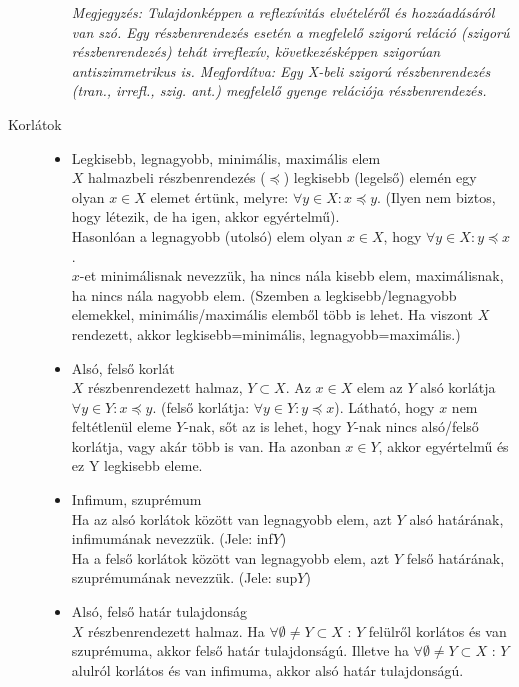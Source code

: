 \documentclass[margin=0px]{article}
\begin{document}
\begin{description}
\begin{itemize}
                  \textit{Megjegyzés: Tulajdonképpen a reflexívitás elvételéről és hozzáadásáról van szó. Egy részbenrendezés esetén a megfelelő szigorú reláció (szigorú részbenrendezés) tehát irreflexív, következésképpen szigorúan antiszimmetrikus is. Megfordítva: Egy X-beli szigorú részbenrendezés (tran., irrefl., szig. ant.) megfelelő gyenge relációja részbenrendezés. }
        \end{itemize}
    \item[Korlátok] \hfill
        \begin{itemize}
            \item Legkisebb, legnagyobb, minimális, maximális elem \\
                  $X$ halmazbeli részbenrendezés ($\preccurlyeq$) legkisebb (legelső) elemén egy olyan $x\in X$ elemet értünk, melyre: $\forall y \in X : x\preccurlyeq y$. (Ilyen nem biztos, hogy létezik, de ha igen, akkor egyértelmű).\\
                  Hasonlóan a legnagyobb (utolsó) elem olyan $x\in X$, hogy $\forall y \in X : y \preccurlyeq x$.\\

                  $x$-et minimálisnak nevezzük, ha nincs nála kisebb elem, maximálisnak, ha nincs nála nagyobb elem. (Szemben a legkisebb/legnagyobb elemekkel, minimális/maximális elemből több is lehet. Ha viszont $X$ rendezett, akkor legkisebb=minimális, legnagyobb=maximális.)
            \item Alsó, felső korlát \\
                  $X$ részbenrendezett halmaz, $Y \subset X$. Az $x \in X$ elem az $Y$ alsó korlátja $\forall y \in Y : x \preccurlyeq y$. (felső korlátja: $\forall y \in Y : y \preccurlyeq x$). Látható, hogy $x$ nem feltétlenül eleme $Y$-nak, sőt az is lehet, hogy $Y$-nak nincs alsó/felső korlátja, vagy akár több is van. Ha azonban $x\in Y$, akkor egyértelmű és ez Y legkisebb eleme.
            \item Infimum, szuprémum \\
                  Ha az alsó korlátok között van legnagyobb elem, azt $Y$ alsó határának, infimumának nevezzük. (Jele: inf$Y$) \\
                  Ha a felső korlátok között van legnagyobb elem, azt $Y$ felső határának, szuprémumának nevezzük. (Jele: sup$Y$)
            \item Alsó, felső határ tulajdonság \\
                  $X$ részbenrendezett halmaz. Ha $ \forall \emptyset \neq Y \subset X$ : $Y$ felülről korlátos és van szuprémuma, akkor felső határ tulajdonságú.
                  Illetve ha $ \forall \emptyset \neq Y \subset X$ : $Y$ alulról korlátos és van infimuma, akkor alsó határ tulajdonságú.
        \end{itemize}
\end{description}
\end{document}

